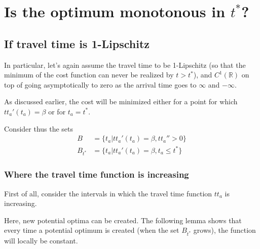 \documentclass{article}
\begin{document}
\section{Is the optimum monotonous in $t^*$?}

\subsection{If travel time is 1-Lipschitz}

In particular, let's again assume the travel time to be 1-Lipschitz (so that the minimum of the cost function can never be realized by \(t > t^*\)), and \(C^1(\mathbb{R})\)
on top of going asymptotically to zero as the arrival time goes to \(\infty\) and \(-\infty\).

As discussed earlier, the cost will be minimized either for a point for which \(tt_a'(t_a) = \beta\) or for \(t_a = t^*\).

Consider thus the sets
\begin{align*}
  B & = \{t_a | tt_a'(t_a) = \beta, tt_a'' > 0\} \\
  B_{t^*}&  = \{t_a | tt_a'(t_a) = \beta, t_a \leq t^*\}
\end{align*}

\subsubsection{Where the travel time function is increasing}

First of all, consider the intervals in which the travel time function \(tt_a\) is increasing.

Here, new potential optima can be created.
The following lemma shows that every time a potential optimum is created (when the set \(B_{t^*} \) grows), the function will locally be constant.
\end{document}
